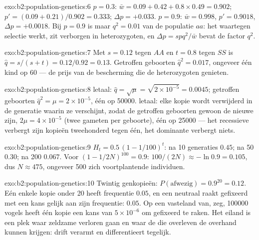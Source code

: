 \begin{solution}{exo:b2:population-genetics:6}
$p = 0.3$: $\bar w = 0.09 + 0.42 + 0.8\times 0.49 = 0.902$; $p' =
(0.09 + 0.21)/0.902 = 0.333$; $\Delta p = +0.033$. $p = 0.9$: $\bar w
= 0.998$, $p' = 0.9018$, $\Delta p = +0.0018$. Bij $p = 0.9$ is maar
$q^{2} = 0.01$ van de populatie $aa$: het  waartegen selectie werkt,
zit verborgen in heterozygoten, en $\Delta p = spq^{2}/\bar w$
bevat de factor $q^{2}$.
\end{solution}

\begin{solution}{exo:b2:population-genetics:7}
Met $s = 0.12$ tegen $AA$ en $t = 0.8$ tegen $SS$ is $\hat q =
s/(s + t) = 0.12/0.92 = 0.13$. Getroffen geboorten $\hat q^{2} = 0.017$,
ongeveer één kind op 60 --- de prijs van de bescherming die de
heterozygoten genieten.
\end{solution}

\begin{solution}{exo:b2:population-genetics:8}
 letaal: $\hat q = \sqrt{\mu} = \sqrt{2\times 10^{-5}} =
0.0045$; getroffen geboorten $\hat q^{2} = \mu = 2\times 10^{-5}$, één op
\num{50000}.  letaal: elke kopie wordt verwijderd in de
generatie waarin ze verschijnt, zodat de getroffen geboorten gewoon de nieuwe
 zijn, $2\mu = 4\times 10^{-5}$ (twee gameten per geboorte), één op
\num{25000} --- het recessieve  verbergt zijn kopieën tweehonderd tegen
één, het dominante verbergt niets.
\end{solution}

\begin{solution}{exo:b2:population-genetics:9}
$H_t = 0.5\,(1 - 1/100)^{t}$: na 10 generaties $0.45$; na 50
$0.30$; na 200 $0.067$. Voor $(1 - 1/2N)^{100} = 0.9$:
$100/(2N) \approx -\ln 0.9 = 0.105$, dus $N \approx 475$, ongeveer 500
zich voortplantende individuen.
\end{solution}

\begin{solution}{exo:b2:population-genetics:10}
Twintig genkopieën: $P(\text{afwezig}) = 0.9^{20} = 0.12$. Eén enkele
kopie onder 20 heeft frequentie $0.05$, en een neutraal  raakt gefixeerd
met een kans gelijk aan zijn frequentie: $0.05$. Op een vasteland van, zeg,
\num{100000} vogels heeft één kopie een kans van $5\times 10^{-6}$
om gefixeerd te raken. Het eiland is een plek waar zeldzame  verloren
gaan en waar de  die overleven de overhand kunnen krijgen: drift
verarmt en differentieert tegelijk.
\end{solution}

